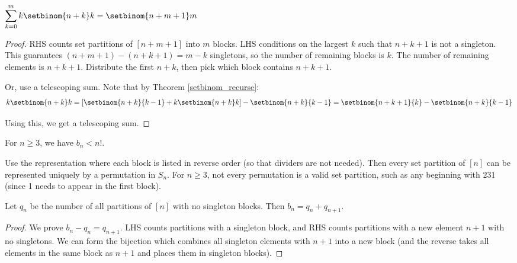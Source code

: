 \documentclass[a4paper]{article}
\begin{document}
\begin{theorem}
$\displaystyle\sum_{k=0}^mk\setbinom{n+k}k=\setbinom{n+m+1}m$

\begin{hl}
\begin{proof}
RHS counts set partitions of $[n+m+1]$ into $m$ blocks. LHS conditions on the largest $k$ such that $n+k+1$ is not a singleton. This guarantees $(n+m+1)-(n+k+1)=m-k$ singletons, so the number of remaining blocks is $k$. The number of remaining elements is $n+k+1$. Distribute the first $n+k$, then pick which block contains $n+k+1$.

\medskip

Or, use a telescoping sum. Note that by Theorem \ref{setbinom_recurse}:
\begin{equation*}
k\setbinom{n+k}k=\left[\setbinom{n+k}{k-1}+k\setbinom{n+k}k\right]-\setbinom{n+k}{k-1}=\setbinom{n+k+1}{k}-\setbinom{n+k}{k-1}
\end{equation*}

Using this, we get a telescoping sum.
\end{proof}
\end{hl}
\end{theorem}

\begin{theorem}
For $n\geq3$, we have $b_n<n!$.

\begin{hl}
Use the representation where each block is listed in reverse order (so that dividers are not needed). Then every set partition of $[n]$ can be represented uniquely by a permutation in $S_n$. For $n\geq3$, not every permutation is a valid set partition, such as any beginning with $231$ (since 1 needs to appear in the first block).
\end{hl}
\end{theorem}

\begin{example}
Let $q_n$ be the number of all partitions of $[n]$ with no singleton blocks. Then $b_n=q_n+q_{n+1}$.

\begin{hl}
\begin{proof}
We prove $b_n-q_n=q_{n+1}$. LHS counts partitions with a singleton block, and RHS counts partitions with a new element $n+1$ with no singletons. We can form the bijection which combines all singleton elements with $n+1$ into a new block (and the reverse takes all elements in the same block as $n+1$ and places them in singleton blocks).
\end{proof}
\end{hl}
\end{example}
\end{document}
